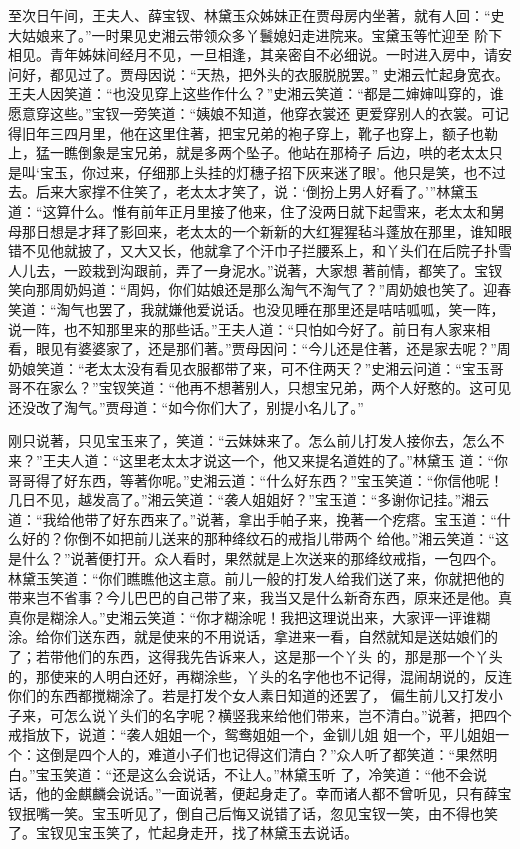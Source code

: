 \begin{parag}


    至次日午间，王夫人、薛宝钗、林黛玉众姊妹正在贾母房内坐著，就有人回：“史大姑娘来了。”一时果见史湘云带领众多丫鬟媳妇走进院来。宝黛玉等忙迎至 阶下相见。青年姊妹间经月不见，一旦相逢，其亲密自不必细说。一时进入房中，请安问好，都见过了。贾母因说：“天热，把外头的衣服脱脱罢。” 史湘云忙起身宽衣。王夫人因笑道：“也没见穿上这些作什么？”史湘云笑道：“都是二婶婶叫穿的，谁愿意穿这些。”宝钗一旁笑道：“姨娘不知道，他穿衣裳还 更爱穿别人的衣裳。可记得旧年三四月里，他在这里住著，把宝兄弟的袍子穿上，靴子也穿上，额子也勒上，猛一瞧倒象是宝兄弟，就是多两个坠子。他站在那椅子 后边，哄的老太太只是叫‘宝玉，你过来，仔细那上头挂的灯穗子招下灰来迷了眼’。他只是笑，也不过去。后来大家撑不住笑了，老太太才笑了，说：‘倒扮上男人好看了。’”林黛玉道：“这算什么。惟有前年正月里接了他来，住了没两日就下起雪来，老太太和舅母那日想是才拜了影回来，老太太的一个新新的大红猩猩毡斗蓬放在那里，谁知眼错不见他就披了，又大又长，他就拿了个汗巾子拦腰系上，和丫头们在后院子扑雪人儿去，一跤栽到沟跟前，弄了一身泥水。”说著，大家想 著前情，都笑了。宝钗笑向那周奶妈道：“周妈，你们姑娘还是那么淘气不淘气了？”周奶娘也笑了。迎春笑道：“淘气也罢了，我就嫌他爱说话。也没见睡在那里还是咭咭呱呱，笑一阵，说一阵，也不知那里来的那些话。”王夫人道：“只怕如今好了。前日有人家来相看，眼见有婆婆家了，还是那们著。”贾母因问：“今儿还是住著，还是家去呢？”周奶娘笑道：“老太太没有看见衣服都带了来，可不住两天？”史湘云问道：“宝玉哥哥不在家么？”宝钗笑道：“他再不想著别人，只想宝兄弟，两个人好憨的。这可见还没改了淘气。”贾母道：“如今你们大了，别提小名儿了。”
\end{parag}


\begin{parag}


    刚只说著，只见宝玉来了，笑道：“云妹妹来了。怎么前儿打发人接你去，怎么不来？”王夫人道：“这里老太太才说这一个，他又来提名道姓的了。”林黛玉 道：“你哥哥得了好东西，等著你呢。”史湘云道：“什么好东西？”宝玉笑道：“你信他呢！几日不见，越发高了。”湘云笑道：“袭人姐姐好？”宝玉道：“多谢你记挂。”湘云道：“我给他带了好东西来了。”说著，拿出手帕子来，挽著一个疙瘩。宝玉道：“什么好的？你倒不如把前儿送来的那种绛纹石的戒指儿带两个 给他。”湘云笑道：“这是什么？”说著便打开。众人看时，果然就是上次送来的那绛纹戒指，一包四个。林黛玉笑道：“你们瞧瞧他这主意。前儿一般的打发人给我们送了来，你就把他的带来岂不省事？今儿巴巴的自己带了来，我当又是什么新奇东西，原来还是他。真真你是糊涂人。”史湘云笑道：“你才糊涂呢！我把这理说出来，大家评一评谁糊涂。给你们送东西，就是使来的不用说话，拿进来一看，自然就知是送姑娘们的了；若带他们的东西，这得我先告诉来人，这是那一个丫头 的，那是那一个丫头的，那使来的人明白还好，再糊涂些，丫头的名字他也不记得，混闹胡说的，反连你们的东西都搅糊涂了。若是打发个女人素日知道的还罢了， 偏生前儿又打发小子来，可怎么说丫头们的名字呢？横竖我来给他们带来，岂不清白。”说著，把四个戒指放下，说道：“袭人姐姐一个，鸳鸯姐姐一个，金钏儿姐 姐一个，平儿姐姐一个：这倒是四个人的，难道小子们也记得这们清白？”众人听了都笑道：“果然明白。”宝玉笑道：“还是这么会说话，不让人。”林黛玉听 了，冷笑道：“他不会说话，他的金麒麟会说话。”一面说著，便起身走了。幸而诸人都不曾听见，只有薛宝钗抿嘴一笑。宝玉听见了，倒自己后悔又说错了话，忽见宝钗一笑，由不得也笑了。宝钗见宝玉笑了，忙起身走开，找了林黛玉去说话。
\end{parag}


